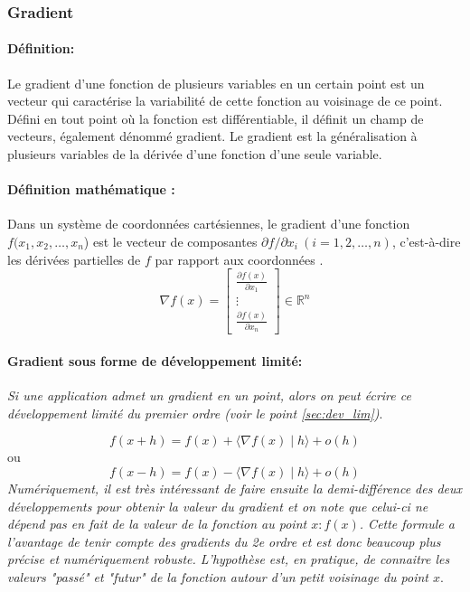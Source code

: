	
	\subsubsection{Gradient}\label{sec:gradient}
		\paragraph*{Définition:}Le gradient d'une fonction de plusieurs variables en un certain point est un vecteur qui caractérise la variabilité de cette fonction au voisinage de ce point. Défini en tout point où la fonction est différentiable, il définit un champ de vecteurs, également dénommé gradient. Le gradient est la généralisation à plusieurs variables de la dérivée d'une fonction d'une seule variable.%
		\paragraph*{Définition mathématique :} Dans un système de coordonnées cartésiennes, le gradient d'une fonction {$ f(x_{1},x_{2},\dots ,x_{n}$)} est le vecteur de composantes {$ \partial f/ \partial x_{i}\ (i=1,2,\dots ,n)$}, c'est-à-dire les dérivées partielles de $f$ par rapport aux coordonnées \cite{jtshiman:2021}.
		$${\nabla f(x)={
				\begin{bmatrix}
					{\frac {\partial f(x)}{\partial x_{1}}}\\
					\vdots \\
					{\frac {\partial f(x)}{\partial x_{n}}}
				\end{bmatrix}}} \in \mathbb{R}^n $$
		\pagebreak
		\paragraph*{Gradient sous forme de développement limité:}
		\textit{Si une application admet un gradient en un point, alors on peut écrire ce développement limité du premier ordre (voir le point \ref{sec:dev_lim})}.
		
		$${ 
			f(x+h)=f(x)+\langle \nabla f(x)\mid h\rangle +o(h) 
		}$$ 
		ou 
		$$ {  
			f(x-h)=f(x)-\langle \nabla f(x)\mid h\rangle +o(h)
		}$$
		\textit{Numériquement, il est très intéressant de faire ensuite la demi-différence des deux développements pour obtenir la valeur du gradient et on note que celui-ci ne dépend pas en fait de la valeur de la fonction au point $x : f (x)$. Cette formule a l'avantage de tenir compte des gradients du 2e ordre et est donc beaucoup plus précise et numériquement robuste. L'hypothèse est, en pratique, de connaitre les valeurs "passé" et "futur" de la fonction autour d'un petit voisinage du point $x$}.\\
